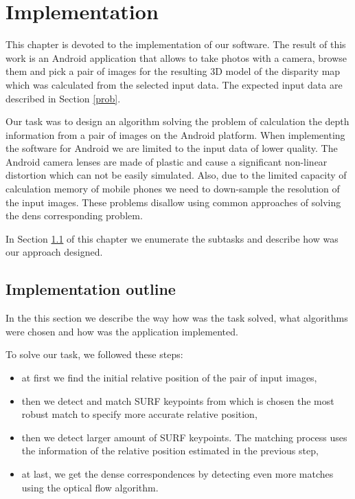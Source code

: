 \chapter{Implementation}
\label{chap:implementation}

This chapter is devoted to the implementation of our software.
The result of this work is an Android application that allows to take photos with a camera, browse them and pick a pair of images for the resulting 3D model of the disparity map which was calculated from the selected input data.
The expected input data are described in Section \ref{prob}.

Our task was to design an algorithm solving the problem of calculation the depth information from a pair of images on the Android platform.
When implementing the software for Android we are limited to the input data of lower quality.
The Android camera lenses are made of plastic and cause a significant non-linear distortion which can not be easily simulated.
Also, due to the limited capacity of calculation memory of mobile phones we need to down-sample the resolution of the input images.
These problems disallow using common approaches of solving the dens corresponding problem.

In Section \ref{sec:impl_outline} of this chapter we enumerate the subtasks and describe how was our approach designed.
 
\section{Implementation outline}
\label{sec:impl_outline}
In the this section we describe the way how was the task solved, what algorithms were chosen and how was the application implemented.

To solve our task, we followed these steps:
\begin{itemize}
\item at first we find the initial relative position of the pair of input images,
\item then we detect and match SURF keypoints from which is chosen the most robust match to specify more accurate relative position,
\item then we detect larger amount of SURF keypoints. The matching process uses the information of the relative position estimated in the previous step,
\item at last, we get the dense correspondences by detecting even more matches using the optical flow algorithm.
\end{itemize}

